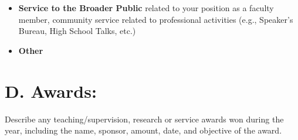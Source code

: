 \documentclass[12pt,letterpaper]{article}
\begin{document}
\begin{itemize}
\item \textbf{Service to the Broader Public} related to your position as a faculty member, community service related to professional activities (e.g., Speaker's Bureau, High School Talks, etc.)
\end{itemize}
\APRServicePublic

\begin{itemize}
\item \textbf{Other}
\end{itemize}
\APRServiceOther

\section*{D. Awards:}

Describe any teaching/supervision, research or service awards won during the year, including the name, sponsor, amount, date, and objective of the award.

\APRAwards
\end{document}

